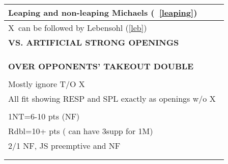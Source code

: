 \documentclass{article}
\newcommand\X{{\footnotesize X}}
\begin{document}
{\begin{minipage}{90mm}
\begin{tabular}{| p{88mm} |}
		\\ \hline
                Leaping and non-leaping Michaels (~\ref{leaping})
		\\ \hline
                \X\ can be followed by Lebensohl (\ref{leb})
		\\ \hline
		\textbf{VS. ARTIFICIAL STRONG OPENINGS} \\ \hline
		\\ \hline
		\\ \hline
		\\ \hline
		\textbf{OVER OPPONENTS' TAKEOUT DOUBLE} \\ \hline
		\\ \hline
                Mostly ignore T/O \X\
		\\ \hline
                All fit showing RESP and SPL
                exactly as openings w/o \X\
		\\ \hline
		\\ \hline
                1NT=6-10 pts (NF)
		\\ \hline
                Rdbl=10+ pts ( can have 3supp for 1M)
		\\ \hline
                2/1 NF, JS preemptive and  NF
		\\ \hline
		\\ \hline
		\\ \hline
	\end{tabular}
\end{minipage}
}
\begin{minipage}{5mm}
	\begin{tabular}{| p{5mm} |}
	\end{tabular}
\end{minipage}
\end{document}
